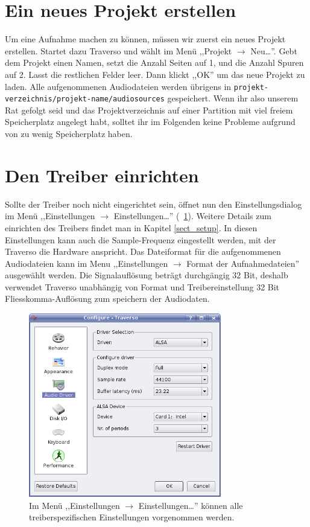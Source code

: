\section{Ein neues Projekt erstellen}
Um eine Aufnahme machen zu können, müssen wir zuerst ein neues Projekt erstellen. Startet dazu Traverso und wählt im Menü ,,Projekt $\rightarrow$ Neu\dots''. Gebt dem Projekt einen Namen, setzt die Anzahl Seiten auf 1, und die Anzahl Spuren auf 2. Lasst die restlichen Felder leer. Dann klickt ,,OK'' um das neue Projekt zu laden. Alle aufgenommenen Audiodateien werden übrigens in \texttt{projekt-verzeichnis/projekt-name/audiosources} gespeichert. Wenn ihr also unserem Rat gefolgt seid und das Projektverzeichnis auf einer Partition mit viel freiem Speicherplatz angelegt habt, solltet ihr im Folgenden keine Probleme aufgrund von zu wenig Speicherplatz haben.

\section{Den Treiber einrichten}
Sollte der Treiber noch nicht eingerichtet sein, öffnet nun den Einstellungsdialog im Menü ,,Einstellungen $\rightarrow$ Einstellungen\dots'' (\FigB\ \ref{fig_driversettings}). Weitere Details zum einrichten des Treibers findet man in Kapitel \ref{sect_setup}. In diesen Einstellungen kann auch die Sample-Frequenz eingestellt werden, mit der Traverso die Hardware anspricht. Das Dateiformat für die aufgenommenen Audiodateien kann im Menu ,,Einstellungen $\rightarrow$ Format der Aufnahmedateien'' ausgewählt werden. Die Signalauflösung beträgt durchgängig 32 Bit, deshalb verwendet Traverso unabhängig von Format und Treibereinstellung 32 Bit Fliesskomma-Auflösung zum speichern der Audiodaten.

\begin{figure}
 \centering\includegraphics[width=0.75\textwidth]{../images/driversettings.png}
 \caption{Im Menü ,,Einstellungen $\rightarrow$ Einstellungen\dots'' können alle treiberspezifischen Einstellungen vorgenommen werden.}
 \label{fig_driversettings}
\end{figure}

